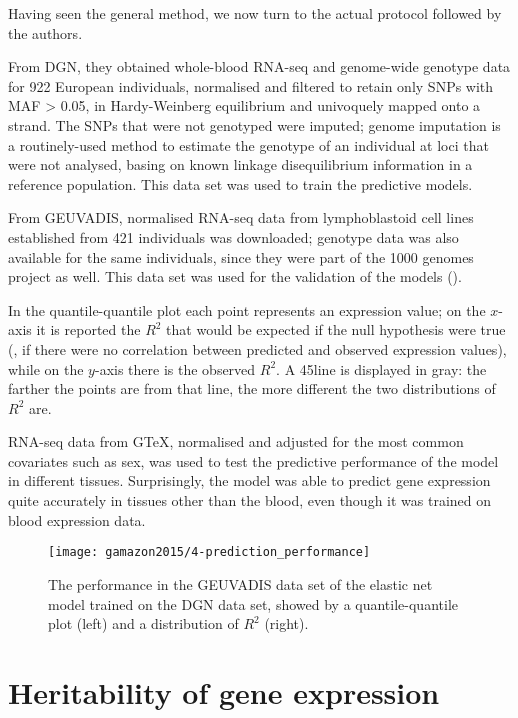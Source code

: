 \documentclass[../main.tex]{subfiles}
\begin{document}
Having seen the general method, we now turn to the actual protocol 
followed by the authors.

From DGN, they obtained whole-blood RNA-seq and genome-wide genotype 
data for 922 European individuals, normalised and filtered to retain 
only SNPs with MAF > 0.05, in Hardy-Weinberg equilibrium and univoquely 
mapped onto a strand. The SNPs that were not genotyped were imputed; 
genome imputation is a routinely-used method to estimate the genotype of 
an individual at loci that were not analysed, basing on known linkage 
disequilibrium information in a reference population. This data set was 
used to train the predictive models.

From GEUVADIS, normalised RNA-seq data from lymphoblastoid cell lines 
established from 421 individuals was downloaded; genotype data was also 
available for the same individuals, since they were part of the 1000 
genomes project as well. This data set was used for the validation of 
the models ().

In the quantile-quantile plot each point represents an expression value; 
on the $x$-axis it is reported the $R^2$ that would be expected if the 
null hypothesis were true (\ie, if there were no correlation between 
predicted and observed expression values), while on the $y$-axis there 
is the observed $R^2$. A 45\textdegree line is displayed in gray: the 
farther the points are from that line, the more different the two 
distributions of $R^2$ are.

RNA-seq data from GTeX, normalised and adjusted for the most common 
covariates such as sex, was used to test the predictive performance of 
the model in different tissues. Surprisingly, the model was able to 
predict gene expression quite accurately in tissues other than the 
blood, even though it was trained on blood expression data.

\begin{figure}
	\texttt{[image: gamazon2015/4-prediction\_performance]}
	\caption{The performance in the GEUVADIS data set of the elastic net 
model trained on the DGN data set, showed by a quantile-quantile plot 
(left) and a distribution of $R^2$ (right).}
\end{figure}

\section{Heritability of gene expression}
\end{document}

